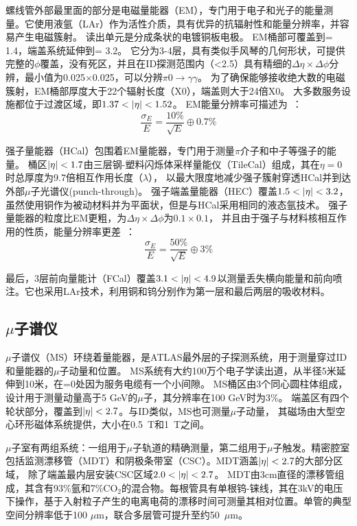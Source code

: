 螺线管外部最里面的部分是电磁量能器（EM），专门用于电子和光子的能量测量。它使用液氩（LAr）作为活性介质，具有优异的抗辐射性和能量分辨率，并容易产生电磁簇射。
读出单元是分成条状的电镀铜板电极。
EM桶部可覆盖到\abseta = 1.4，端盖系统延伸到\abseta = 3.2。
它分为3-4层，具有类似手风琴的几何形状，可提供完整的$\phi$覆盖，没有死区，并且在ID探测范围内（\abseta <2.5）具有精细的$\Delta \eta\times\Delta\phi$分辨，最小值为0.025$\times$0.025，可以分辨$\pi0\rightarrow \gamma\gamma$。
为了确保能够接收绝大数的电磁簇射，EM桶部厚度大于22个辐射长度（X0），端盖则大于24倍X0。
大多数服务设施都位于过渡区域，即$1.37<\abseta<1.52$。
EM能量分辨率可描述为~\cite{ATLAS_Collaboration_2008}：
\begin{equation}
\frac{\sigma_{E}}{E}=\frac{10\%}{\sqrt{E}}\oplus0.7\%
\end{equation}

强子量能器（HCal）包围着EM量能器，专门用于测量$\pi$介子和中子等强子的能量。 桶区$|\eta|<1.7$由三层钢-塑料闪烁体采样量能仪（TileCal）组成，其在$\eta = 0$时总厚度为9.7倍相互作用长度（$\lambda$），
以最大限度地减少强子簇射穿透HCal并到达外部$\mu$子光谱仪(punch-through)。
强子端盖量能器（HEC）覆盖$1.5<\abseta<3.2$，虽然使用铜作为被动材料并为平面状，但是与HCal采用相同的液态氩技术。
强子量能器的粒度比EM更粗，为$\Delta \eta\times\Delta\phi$为$0.1\times0.1$，
并且由于强子与材料核相互作用的性质，能量分辨率更差~\cite{ATLAS_Collaboration_2008}：
\begin{equation}
\frac{\sigma_{E}}{E}=\frac{50\%}{\sqrt{E}}\oplus3\%
\end{equation}

最后，3层前向量能计（FCal）覆盖$3.1<\abseta<4.9$以测量丢失横向能量和前向喷注。它也采用LAr技术，利用铜和钨分别作为第一层和最后两层的吸收材料。

\subsection{$\mu$子谱仪}
$\mu$子谱仪（MS）环绕着量能器，是ATLAS最外层的子探测系统，用于测量穿过ID和量能器的$\mu$子动量和位置。 MS系统有大约100万个电子学读出道，从半径5米延伸到10米，在\abseta =0处因为服务电缆有一个小间隙。
MS桶区由3个同心圆柱体组成，设计用于测量动量高于5 GeV的$\mu$子，其分辨率在100 GeV时为3\%。 端盖区有四个轮状部分，覆盖到$|\eta|<2.7$。与ID类似，MS也可测量$\mu$子动量，
其磁场由大型空心环形磁体系统提供，大小在0.5~T和1~T之间。

$\mu$子室有两组系统：一组用于$\mu$子轨道的精确测量，第二组用于$\mu$子触发。精密腔室包括监测漂移管（MDT）\cite{Bauer:2016gyg}和阴极条带室（CSC）\cite{Argyropoulos:2009zz}。MDT涵盖$|\eta|<2.7$的大部分区域，
 除了端盖最内层安装CSC区域$2.0<\abseta<2.7$。
 MDT由3cm直径的漂移管组成，其含有93\%氩和7\%CO$_{2}$的混合物。每根管具有单根钨-铼线，其在3kV的电压下操作，基于入射粒子产生的电离电荷的漂移时间可测量其相对位置。单管的典型空间分辨率低于100 $\mu\text{m}$，联合多层管可提升至约50~$\mu\text{m}$。

